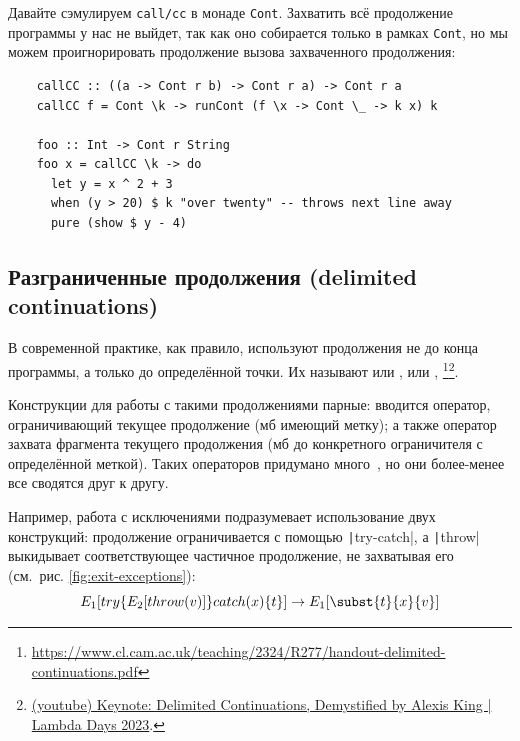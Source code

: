 Давайте сэмулируем \texttt{call/cc} в монаде \texttt{Cont}.
Захватить всё продолжение программы у нас не выйдет, так как оно собирается только в рамках \texttt{Cont}, но мы можем проигнорировать продолжение вызова захваченного продолжения:
\begin{verbatim}
    callCC :: ((a -> Cont r b) -> Cont r a) -> Cont r a
    callCC f = Cont \k -> runCont (f \x -> Cont \_ -> k x) k

    foo :: Int -> Cont r String
    foo x = callCC \k -> do
      let y = x ^ 2 + 3
      when (y > 20) $ k "over twenty" -- throws next line away
      pure (show $ y - 4)
\end{verbatim}

\subsection{Разграниченные продолжения (delimited continuations)} \label{subsec:delimited-cont}

В современной практике, как правило, используют продолжения не до конца программы, а только до определённой точки.
Их называют  или ,  или , \footnote{\url{https://www.cl.cam.ac.uk/teaching/2324/R277/handout-delimited-continuations.pdf}}\footnote{\href{https://youtu.be/TE48LsgVlIU?si=cBdUCzYwYWpwPkkh}{(youtube)  Keynote: Delimited Continuations, Demystified by Alexis King | Lambda Days 2023}.}.

Конструкции для работы с такими продолжениями парные: вводится оператор, ограничивающий текущее продолжение (мб имеющий метку); а также оператор захвата фрагмента текущего продолжения (мб до конкретного ограничителя с определённой меткой).
Таких операторов придумано много~\cite[приложение А]{hillerstrom2022foundations}, но они более-менее все сводятся друг к другу.

Например, работа с исключениями подразумевает использование двух конструкций: продолжение ограничивается с помощью \texttt|try-catch|, а \texttt|throw| выкидывает соответствующее частичное продолжение, не захватывая его (см.\ рис. \ref{fig:exit-exceptions}):
\[
    E_1[try\{E_2[throw(v)]\}catch(x) \{t\}] \to E_1[\subst{t}{x}{v}]
\]


